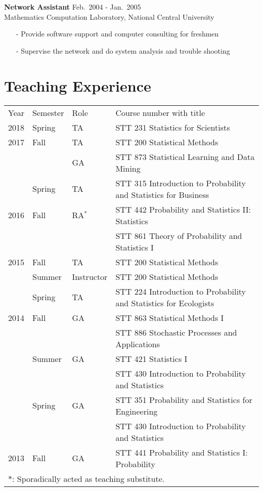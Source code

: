 \documentclass[a4paper,10pt,dvipdfmx]{article}
\begin{document}
\indent \textbf{Network Assistant} \hfill Feb.~2004 - Jan.~2005\\
\indent Mathematics Computation Laboratory, National Central University
\begin{itemize}[noitemsep,nolistsep,leftmargin=12mm]
  \item[-] Provide software support and computer consulting for freshmen
  \item[-] Supervise the network and do system analysis and trouble shooting
\end{itemize}

\section*{Teaching Experience}
\begin{small}
  \begin{tabular}{llll}
    Year  & Semester& Role       & Course number with title\\
    2018  & Spring  & TA         & STT 231 Statistics for Scientists\\
    2017  & Fall	  & TA				 & STT 200 Statistical Methods\\
          &			    & GA				 & STT 873 Statistical Learning and Data Mining\\
          & Spring  & TA				 & STT 315 Introduction to Probability and Statistics for Business\\
    2016  & Fall    & RA$^{*}$   & STT 442 Probability and Statistics II: Statistics\\
          &         &            & STT 861 Theory of Probability and Statistics I\\
    2015  & Fall	  & TA				 & STT 200 Statistical Methods\\
          & Summer  & Instructor & STT 200 Statistical Methods\\
          & Spring  & TA				 & STT 224 Introduction to Probability and Statistics for Ecologists\\
    2014  & Fall	  & GA				 & STT 863 Statistical Methods I\\
          &			    &						 & STT 886 Stochastic Processes and Applications\\
          & Summer  & GA				 & STT 421 Statistics I\\
          &			    &						 & STT 430 Introduction to Probability and Statistics\\
          & Spring  & GA				 & STT 351 Probability and Statistics for Engineering\\
          &			    &						 & STT 430 Introduction to Probability and Statistics\\
    2013  & Fall	  & GA				 & STT 441 Probability and Statistics I: Probability\\
    \multicolumn{4}{l}{$*$: Sporadically acted as teaching substitute.}
  \end{tabular}
\end{small}
\end{document}
